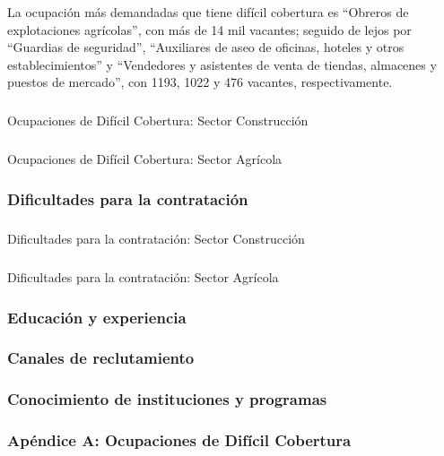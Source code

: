 \documentclass[
  14pt,
]{article}
\makeatletter
\let\oldsubparagraph\subparagraph
\renewcommand{\subparagraph}{
    \@ifstar
      \xxxSubParagraphStar
      \xxxSubParagraphNoStar
  }
\newcommand{\xxxSubParagraphStar}[1]{\oldsubparagraph*{#1}\mbox{}}
\newcommand{\xxxSubParagraphNoStar}[1]{\oldsubparagraph{#1}\mbox{}}
\makeatother
\begin{document}
La ocupación más demandadas que tiene difícil cobertura es ``Obreros de
explotaciones agrícolas'', con más de 14 mil vacantes; seguido de lejos
por ``Guardias de seguridad'', ``Auxiliares de aseo de oficinas, hoteles
y otros establecimientos'' y ``Vendedores y asistentes de venta de
tiendas, almacenes y puestos de mercado'', con 1193, 1022 y 476
vacantes, respectivamente.

\subparagraph{Ocupaciones de Difícil Cobertura: Sector
Construcción}\label{ocupaciones-de-difuxedcil-cobertura-sector-construcciuxf3n}

\subparagraph{Ocupaciones de Difícil Cobertura: Sector
Agrícola}\label{ocupaciones-de-difuxedcil-cobertura-sector-agruxedcola}

\subsubsection{Dificultades para la
contratación}\label{dificultades-para-la-contrataciuxf3n}

\subparagraph{Dificultades para la contratación: Sector
Construcción}\label{dificultades-para-la-contrataciuxf3n-sector-construcciuxf3n}

\subparagraph{Dificultades para la contratación: Sector
Agrícola}\label{dificultades-para-la-contrataciuxf3n-sector-agruxedcola}

\subsubsection{Educación y
experiencia}\label{educaciuxf3n-y-experiencia}

\subsubsection{Canales de reclutamiento}\label{canales-de-reclutamiento}

\subsubsection{Conocimiento de instituciones y
programas}\label{conocimiento-de-instituciones-y-programas}

\subsubsection{Apéndice A: Ocupaciones de Difícil
Cobertura}\label{apuxe9ndice-a-ocupaciones-de-difuxedcil-cobertura}
\end{document}
